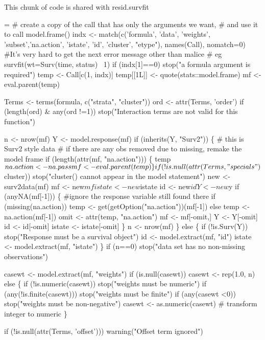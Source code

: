 \documentclass{article}
\begin{document}
This chunk of code is shared with resid.survfit
\begin{nwchunk}
=
 # create a copy of the call that has only the arguments we want,
 #  and use it to call model.frame()
 indx <- match(c('formula', 'data', 'weights', 'subset','na.action',
                 'istate', 'id', 'cluster', "etype"), names(Call), nomatch=0)
 #It's very hard to get the next error message other than malice
 #  eg survfit(wt=Surv(time, status) ~1) 
 if (indx[1]==0) stop("a formula argument is required")
 temp <- Call[c(1, indx)]
 temp[[1L]] <- quote(stats::model.frame)
 mf <- eval.parent(temp)
 
 Terms <- terms(formula, c("strata", "cluster"))
 ord <- attr(Terms, 'order')
 if (length(ord) & any(ord !=1))
         stop("Interaction terms are not valid for this function")
 
 n <- nrow(mf)
 Y <- model.response(mf)
 if (inherits(Y, "Surv2")) \{
     # this is Surv2 style data
     # if there are any obs removed due to missing, remake the model frame
     if (length(attr(mf, "na.action"))) \{
         temp$na.action <- na.pass
         mf <- eval.parent(temp)
     \}
     if (!is.null(attr(Terms, "specials")$cluster))
         stop("cluster() cannot appear in the model statement")
     new <- surv2data(mf)
     mf <- new$mf
     istate <- new$istate
     id <- new$id
     Y <- new$y
     if (anyNA(mf[-1])) \{ #ignore the response variable still found there
         if (missing(na.action)) temp <- get(getOption("na.action"))(mf[-1])
         else temp <- na.action(mf[-1])
         omit <- attr(temp, "na.action")
         mf <- mf[-omit,]
         Y <- Y[-omit]
         id <- id[-omit]
         istate <- istate[-omit]
     \}                      
     n <- nrow(mf)
 \}       
 else \{
     if (!is.Surv(Y)) stop("Response must be a survival object")
     id <- model.extract(mf, "id")
     istate <- model.extract(mf, "istate")
 \}
 if (n==0) stop("data set has no non-missing observations")
 
 casewt <- model.extract(mf, "weights")
 if (is.null(casewt)) casewt <- rep(1.0, n)
 else \{
     if (!is.numeric(casewt)) stop("weights must be numeric")
     if (any(!is.finite(casewt))) stop("weights must be finite") 
     if (any(casewt <0)) stop("weights must be non-negative")
     casewt <- as.numeric(casewt)  # transform integer to numeric
 \}
 
 if (!is.null(attr(Terms, 'offset'))) warning("Offset term ignored")
 

\end{nwchunk}
\end{document}
